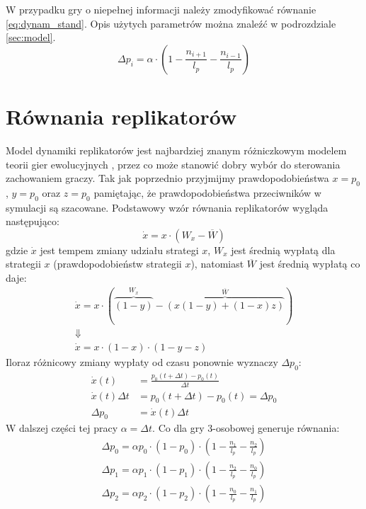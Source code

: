 W przypadku gry o niepełnej informacji należy zmodyfikować równanie \ref{eq:dynam_stand}. Opis użytych parametrów można znaleźć w podrozdziale \ref{sec:model}.
\begin{equation} \label{eq:stand}
\Delta p_i = \alpha \cdot (1 - \frac{n_{i+1}}{l_p} - \frac{n_{i-1}}{l_p})
\end{equation}


\section{Równania replikatorów}
\label{sec:r_repli}
Model dynamiki replikatorów jest najbardziej znanym różniczkowym modelem teorii gier ewolucyjnych \cite{Now06}\cite{Hof98}, przez co może stanowić dobry wybór do sterowania zachowaniem graczy. Tak jak poprzednio przyjmijmy prawdopodobieństwa $x=p_0$, $y=p_0$ oraz $z=p_0$ pamiętając, że prawdopodobieństwa przeciwników w symulacji są szacowane. Podstawowy wzór równania replikatorów wygląda następująco:
\begin{equation}
\dot{x} = x \cdot ( W_x - \overline{W})
\end{equation}
gdzie $\dot{x}$ jest tempem zmiany udziału strategi $x$, $W_x$ jest średnią wypłatą dla strategii $x$ (prawdopodobieństw strategii $x$), natomiast $\overline{W}$ jest średnią wypłatą co daje:
\begin{gather*}
\dot{x} = x \cdot ( \overbrace{(1-y)}^{W_x} - \overbrace{(x(1-y) + (1-x)z)}^{\overline{W}}) \\
\Downarrow \\
\dot{x} = x \cdot (1-x) \cdot (1-y-z)
\end{gather*}
Iloraz różnicowy zmiany wypłaty od czasu ponownie wyznaczy $\Delta p_0$:
\begin{align*}
\dot{x}(t) &= \frac{p_0(t+\Delta t)-p_0(t)}{\Delta t} \\
\dot{x}(t) \Delta t &= p_0(t+\Delta t)-p_0(t) = \Delta p_0 \\
\Delta p_0 &= \dot{x}(t) \Delta t
\end{align*} 
W dalszej części tej pracy $\alpha=\Delta t$. Co dla gry 3-osobowej generuje równania:
\begin{align} \label{eq:repli}
\Delta p_0 = \alpha p_0 \cdot (1 - p_0) \cdot (1 - \frac{n_1}{l_p} - \frac{n_2}{l_p}) \nonumber \\
\Delta p_1 = \alpha p_1 \cdot (1 - p_1) \cdot (1 - \frac{n_2}{l_p} - \frac{n_0}{l_p}) \\
\Delta p_2 = \alpha p_2 \cdot (1 - p_2) \cdot (1 - \frac{n_0}{l_p} - \frac{n_1}{l_p}) \nonumber
\end{align} 

